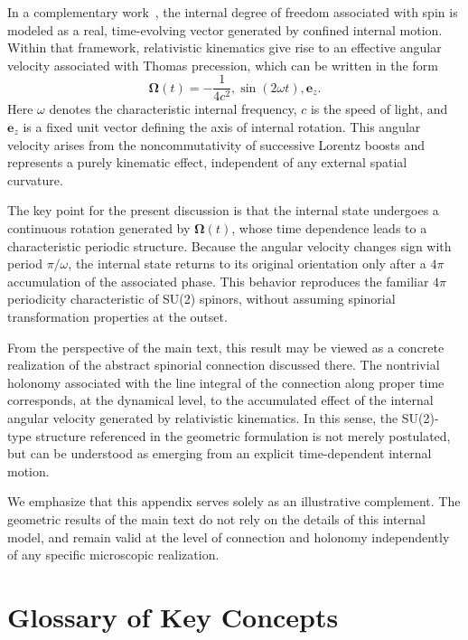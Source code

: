 \documentclass[%
 reprint,
 amsmath,amssymb,
 aps,
 prb,
]{revtex4-2}
\numberwithin{equation}{section}
\begin{document}
In a complementary work~\cite{hanamura17765238}, the internal degree of freedom associated with spin is modeled as a real, time-evolving vector generated by confined internal motion. Within that framework, relativistic kinematics give rise to an effective angular velocity associated with Thomas precession, which can be written in the form
\begin{equation}
\boldsymbol{\Omega}(t) = -\frac{1}{4c^2},\sin(2\omega t),\mathbf e_z.
\end{equation}
Here $\omega$ denotes the characteristic internal frequency, $c$ is the speed of light, and $\mathbf e_z$ is a fixed unit vector defining the axis of internal rotation. This angular velocity arises from the noncommutativity of successive Lorentz boosts and represents a purely kinematic effect, independent of any external spatial curvature.

The key point for the present discussion is that the internal state undergoes a continuous rotation generated by $\boldsymbol{\Omega}(t)$, whose time dependence leads to a characteristic periodic structure. Because the angular velocity changes sign with period $\pi/\omega$, the internal state returns to its original orientation only after a $4\pi$ accumulation of the associated phase. This behavior reproduces the familiar $4\pi$ periodicity characteristic of SU(2) spinors, without assuming spinorial transformation properties at the outset.

From the perspective of the main text, this result may be viewed as a concrete realization of the abstract spinorial connection discussed there. The nontrivial holonomy associated with the line integral of the connection along proper time corresponds, at the dynamical level, to the accumulated effect of the internal angular velocity generated by relativistic kinematics. In this sense, the SU(2)-type structure referenced in the geometric formulation is not merely postulated, but can be understood as emerging from an explicit time-dependent internal motion.

We emphasize that this appendix serves solely as an illustrative complement. The geometric results of the main text do not rely on the details of this internal model, and remain valid at the level of connection and holonomy independently of any specific microscopic realization.

\section{Glossary of Key Concepts}
\label{app:glossary}
\end{document}
